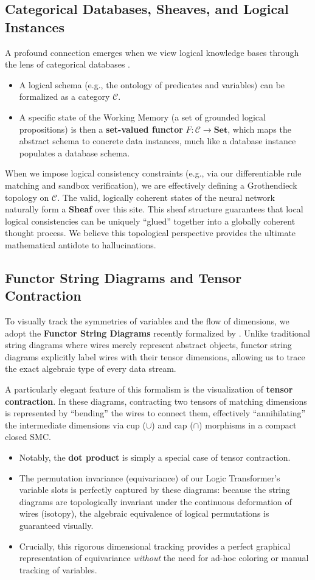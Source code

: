 \documentclass[runningheads]{llncs}
\begin{document}
\subsection{Categorical Databases, Sheaves, and Logical Instances}
A profound connection emerges when we view logical knowledge bases through the lens of categorical databases \cite{Spivak2014}.
\begin{itemize}
	\item A logical schema (e.g., the ontology of predicates and variables) can be formalized as a category $\mathcal{C}$.
	\item A specific state of the Working Memory (a set of grounded logical propositions) is then a \textbf{set-valued functor} $F: \mathcal{C} \to \mathbf{Set}$, which maps the abstract schema to concrete data instances, much like a database instance populates a database schema.
\end{itemize}
When we impose logical consistency constraints (e.g., via our differentiable rule matching and sandbox verification), we are effectively defining a Grothendieck topology on $\mathcal{C}$. The valid, logically coherent states of the neural network naturally form a \textbf{Sheaf} over this site. This sheaf structure guarantees that local logical consistencies can be uniquely ``glued'' together into a globally coherent thought process. We believe this topological perspective provides the ultimate mathematical antidote to hallucinations.

\subsection{Functor String Diagrams and Tensor Contraction}
To visually track the symmetries of variables and the flow of dimensions, we adopt the \textbf{Functor String Diagrams} recently formalized by \cite{Abbott2024}. Unlike traditional string diagrams where wires merely represent abstract objects, functor string diagrams explicitly label wires with their tensor dimensions, allowing us to trace the exact algebraic type of every data stream.

A particularly elegant feature of this formalism is the visualization of \textbf{tensor contraction}. In these diagrams, contracting two tensors of matching dimensions is represented by ``bending'' the wires to connect them, effectively ``annihilating'' the intermediate dimensions via cup ($\cup$) and cap ($\cap$) morphisms in a compact closed SMC.
\begin{itemize}
	\item Notably, the \textbf{dot product} is simply a special case of tensor contraction.
	\item The permutation invariance (equivariance) of our Logic Transformer's variable slots is perfectly captured by these diagrams: because the string diagrams are topologically invariant under the continuous deformation of wires (isotopy), the algebraic equivalence of logical permutations is guaranteed visually.
	\item Crucially, this rigorous dimensional tracking provides a perfect graphical representation of equivariance \textit{without} the need for ad-hoc coloring or manual tracking of variables.
\end{itemize}
\end{document}
